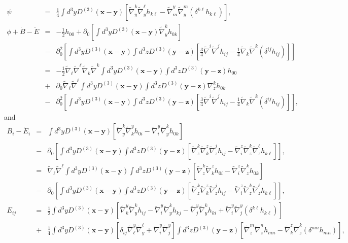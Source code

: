 \documentclass[aps,onecolumn,10pt]{revtex4}
\numberwithin{equation}{section}
\numberwithin{equation}{section}
\begin{document}
%
\begin{eqnarray}
\psi&=&\frac{1}{4}\int d^3yD^{(3)}(\mathbf{x}-\mathbf{y})\left[\tilde{\nabla}_y^k \tilde{\nabla}_y^{\ell}h_{k\ell}-\tilde{\nabla}^y_m\tilde{\nabla}_y^m(\delta^{k\ell}h_{k\ell})\right],
\nonumber\\
\phi+\dot{B}-\ddot{E}&=&-\frac{1}{2} h_{00}
+\partial_0\left[\int d^3y D^{(3)}(\mathbf x - \mathbf y) \tilde\nabla^k_y h_{0k}\right]
\nonumber\\
&-&\partial_0^2\left[\int d^3y D^{(3)}(\mathbf x - \mathbf y) \int d^3z D^{(3)}(\mathbf y - \mathbf z)
\left[ \frac{3}{4} \tilde{\nabla}^i \tilde{\nabla}^jh_{ij}-\frac{1}{4}\tilde{\nabla}_k\tilde{\nabla}^k(\delta^{ij}h_{ij})
\right]\right]
\nonumber\\
&=&-\tfrac{1}{2}\tilde{\nabla}_{\ell}\tilde{\nabla}^{\ell} \tilde{\nabla}_k\tilde{\nabla}^k\int d^3y D^{(3)}(\mathbf x - \mathbf y) \int d^3z D^{(3)}(\mathbf y - \mathbf z)h_{00}
\nonumber\\
&+&\partial_0\tilde{\nabla}_{\ell}\tilde{\nabla}^{\ell}\int d^3y D^{(3)}(\mathbf x - \mathbf y) \int d^3z D^{(3)}(\mathbf y - \mathbf z)\nabla^k_z h_{0k}
\nonumber\\
&-&\partial_0^2\left[\int d^3y D^{(3)}(\mathbf x - \mathbf y) \int d^3z D^{(3)}(\mathbf y - \mathbf z)
\left[ \frac{3}{4} \tilde{\nabla}^i \tilde{\nabla}^jh_{ij}-\frac{1}{4}\tilde{\nabla}_k\tilde{\nabla}^k(\delta^{ij}h_{ij})
\right]\right],
\label{2.7}
\end{eqnarray}
%
and 
%
\begin{eqnarray}
B_i -\dot{E}_i&=& \int d^3y D^{(3)}(\mathbf x - \mathbf y)\left[ \tilde\nabla^k_y \tilde\nabla_k^y h_{0i}
- \tilde\nabla_i^y \tilde\nabla^k_y h_{0k} \right]
\nonumber\\
&-&\partial_0\left[\int d^3y D^{(3)}(\mathbf x - \mathbf y) \int d^3z D^{(3)}(\mathbf y - \mathbf z)
\left[ \tilde\nabla^k_z \tilde\nabla_k^z \tilde\nabla^j_z h_{ij}-\tilde\nabla_i^z \tilde\nabla^k_z \tilde\nabla^{\ell}_z h_{k\ell}\right]\right],
\nonumber\\
&=&\tilde{\nabla}_{\ell}\tilde{\nabla}^{\ell} \int d^3y D^{(3)}(\mathbf x - \mathbf y) \int d^3z D^{(3)}(\mathbf y - \mathbf z)\left[ \tilde\nabla^k_z \tilde\nabla_k^z h_{0i}
- \tilde\nabla_i^z \tilde\nabla^k_z h_{0k} \right]
\nonumber\\
&-&\partial_0\left[\int d^3y D^{(3)}(\mathbf x - \mathbf y) \int d^3z D^{(3)}(\mathbf y - \mathbf z)
\left[ \tilde\nabla^k_z \tilde\nabla_k^z \tilde\nabla^j_z h_{ij}-\tilde\nabla_i^z \tilde\nabla^k_z \tilde\nabla^{\ell}_z h_{k\ell}\right]\right],
\nonumber\\
E_{ij}&=&\frac{1}{2}\int d^3yD^{(3)}(\mathbf{x}-\mathbf{y})\left[\tilde{\nabla}^y_k\tilde{\nabla}_y^kh_{ij}-\tilde{\nabla}^y_i\tilde{\nabla}_y^kh_{kj}-\tilde{\nabla}^y_j\tilde{\nabla}_y^kh_{ki}+\tilde{\nabla}^y_i\tilde{\nabla}^y_j(\delta^{k\ell}h_{k\ell})\right]
\nonumber\\
&+&\frac{1}{4}\int d^3yD^{(3)}(\mathbf{x}-\mathbf{y})\left[\delta_{ij}\tilde{\nabla}^y_{\ell}\tilde{\nabla}_y^{\ell}+\tilde{\nabla}^y_i\tilde{\nabla}^y_j\right]\int d^3zD^{(3)}(\mathbf{y}-\mathbf{z})\left[\tilde{\nabla}_z^m \tilde{\nabla}_z^{n}h_{mn}-\tilde{\nabla}^z_k\tilde{\nabla}_z^k(\delta^{mn}h_{mn})\right],
\label{2.8}
\end{eqnarray}
\end{document}
